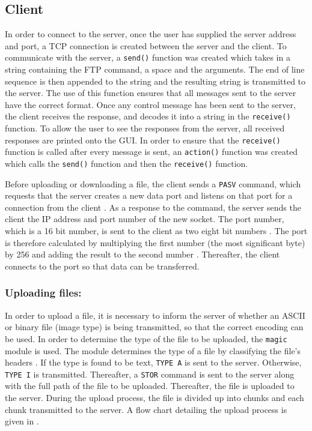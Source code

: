 \documentclass[10pt,twocolumn]{witseiepaper}
\begin{document}
\subsection{Client}
In order to connect to the server, once the user has supplied the server address and port, a TCP connection is created between the server and the client. To communicate with the server, a \texttt{send()} function was created which takes in a string containing the FTP command, a space and the arguments. The end of line sequence is then appended to the string and the resulting string is transmitted to the server. The use of this function ensures that all messages sent to the server have the correct format. Once any control message has been sent to the server, the client receives the response, and decodes it into a string in the \texttt{receive()} function. To allow the user to see the responses from the server, all received responses are printed onto the GUI. In order to ensure that the \texttt{receive()} function is called after every message is sent, an \texttt{action()} function was created which calls the \texttt{send()} function and then the \texttt{receive()} function. 

Before uploading or downloading a file, the client sends a \texttt{PASV} command, which requests that the server creates a new data port and listens on that port for a connection from the client \cite{rfc}. As a response to the command, the server sends the client the IP address and port number of the new socket. The port number, which is a 16 bit number, is sent to the client as two eight bit numbers  \cite{rfc}. The port is therefore calculated by multiplying the first number (the most significant byte) by 256 and adding the result to the second number \cite{rfc}. Thereafter, the client connects to the port so that data can be transferred.

\subsubsection*{Uploading files:}
In order to upload a file, it is necessary to inform the server of whether an ASCII or binary file (image type) is being transmitted, so that the correct encoding can be used. In order to determine the type of the file to be uploaded, the \texttt{magic} module is used. The module determines the type of a file by classifying the file's headers \cite{magic}. If the type is found to be text, \texttt{TYPE A} is sent to the server. Otherwise, \texttt{TYPE I} is transmitted. Thereafter, a \texttt{STOR} command is sent to the server along with the full path of the file to be uploaded. Thereafter, the file is uploaded to the server. During the upload process, the file is divided up into chunks and each chunk transmitted to the server. A flow chart detailing the upload process is given in .
\end{document}
